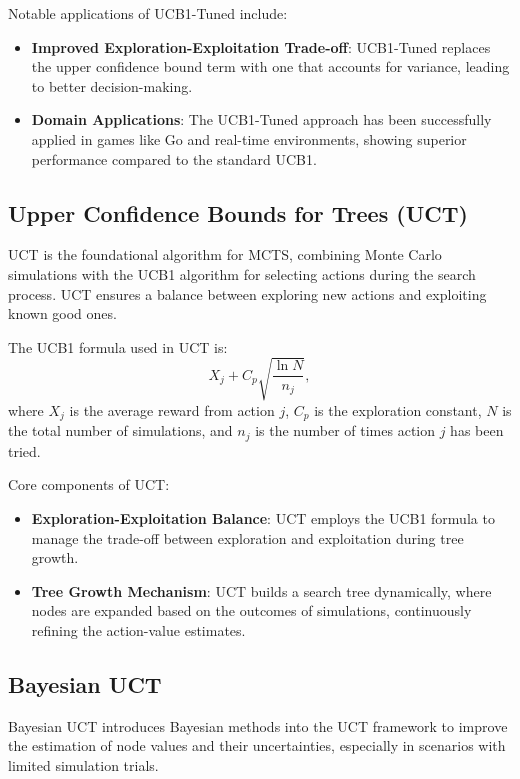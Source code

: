 Notable applications of UCB1-Tuned include:
\begin{itemize}
    \item \textbf{Improved Exploration-Exploitation Trade-off}: UCB1-Tuned replaces the upper confidence bound term with one that accounts for variance, leading to better decision-making.
    \item \textbf{Domain Applications}: The UCB1-Tuned approach has been successfully applied in games like Go and real-time environments, showing superior performance compared to the standard UCB1.
\end{itemize}

\subsection{Upper Confidence Bounds for Trees (UCT)}
UCT is the foundational algorithm for MCTS, combining Monte Carlo simulations with the UCB1 algorithm for selecting actions during the search process. UCT ensures a balance between exploring new actions and exploiting known good ones.

The UCB1 formula used in UCT is:
\begin{equation}
    X_j + C_p \sqrt{\frac{\ln N}{n_j}},
\end{equation}
where \( X_j \) is the average reward from action \( j \), \( C_p \) is the exploration constant, \( N \) is the total number of simulations, and \( n_j \) is the number of times action \( j \) has been tried.

Core components of UCT:
\begin{itemize}
    \item \textbf{Exploration-Exploitation Balance}: UCT employs the UCB1 formula to manage the trade-off between exploration and exploitation during tree growth.
    \item \textbf{Tree Growth Mechanism}: UCT builds a search tree dynamically, where nodes are expanded based on the outcomes of simulations, continuously refining the action-value estimates.
\end{itemize}

\subsection{Bayesian UCT}
Bayesian UCT introduces Bayesian methods into the UCT framework to improve the estimation of node values and their uncertainties, especially in scenarios with limited simulation trials.

